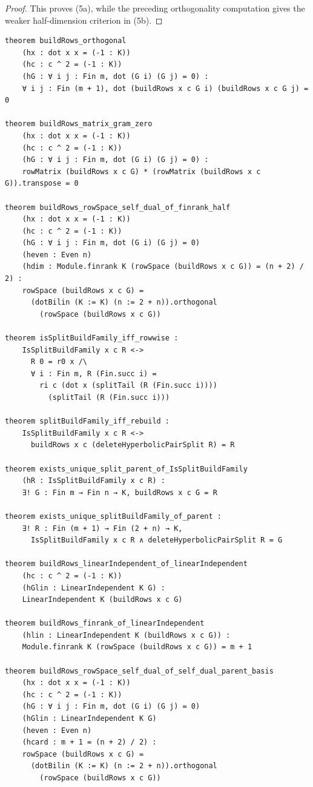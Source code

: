\documentclass[12pt]{article}
\newenvironment{blueblock}{\begingroup\color{blue}}{\endgroup}
\begin{document}
\begin{blueblock}
\begin{proof}
This proves (5a), while the preceding orthogonality computation gives the weaker half-dimension criterion in (5b).
\end{proof}

\begin{lstlisting}[caption={Lean bundle for Theorem~\ref{thm:qary-building-up}.}]
theorem buildRows_orthogonal
    (hx : dot x x = (-1 : K))
    (hc : c ^ 2 = (-1 : K))
    (hG : ∀ i j : Fin m, dot (G i) (G j) = 0) :
    ∀ i j : Fin (m + 1), dot (buildRows x c G i) (buildRows x c G j) = 0

theorem buildRows_matrix_gram_zero
    (hx : dot x x = (-1 : K))
    (hc : c ^ 2 = (-1 : K))
    (hG : ∀ i j : Fin m, dot (G i) (G j) = 0) :
    rowMatrix (buildRows x c G) * (rowMatrix (buildRows x c G)).transpose = 0

theorem buildRows_rowSpace_self_dual_of_finrank_half
    (hx : dot x x = (-1 : K))
    (hc : c ^ 2 = (-1 : K))
    (hG : ∀ i j : Fin m, dot (G i) (G j) = 0)
    (heven : Even n)
    (hdim : Module.finrank K (rowSpace (buildRows x c G)) = (n + 2) / 2) :
    rowSpace (buildRows x c G) =
      (dotBilin (K := K) (n := 2 + n)).orthogonal
        (rowSpace (buildRows x c G))

theorem isSplitBuildFamily_iff_rowwise :
    IsSplitBuildFamily x c R <->
      R 0 = r0 x /\
      ∀ i : Fin m, R (Fin.succ i) =
        ri c (dot x (splitTail (R (Fin.succ i))))
          (splitTail (R (Fin.succ i)))

theorem splitBuildFamily_iff_rebuild :
    IsSplitBuildFamily x c R <->
      buildRows x c (deleteHyperbolicPairSplit R) = R

theorem exists_unique_split_parent_of_IsSplitBuildFamily
    (hR : IsSplitBuildFamily x c R) :
    ∃! G : Fin m → Fin n → K, buildRows x c G = R

theorem exists_unique_splitBuildFamily_of_parent :
    ∃! R : Fin (m + 1) → Fin (2 + n) → K,
      IsSplitBuildFamily x c R ∧ deleteHyperbolicPairSplit R = G

theorem buildRows_linearIndependent_of_linearIndependent
    (hc : c ^ 2 = (-1 : K))
    (hGlin : LinearIndependent K G) :
    LinearIndependent K (buildRows x c G)

theorem buildRows_finrank_of_linearIndependent
    (hlin : LinearIndependent K (buildRows x c G)) :
    Module.finrank K (rowSpace (buildRows x c G)) = m + 1

theorem buildRows_rowSpace_self_dual_of_self_dual_parent_basis
    (hx : dot x x = (-1 : K))
    (hc : c ^ 2 = (-1 : K))
    (hG : ∀ i j : Fin m, dot (G i) (G j) = 0)
    (hGlin : LinearIndependent K G)
    (heven : Even n)
    (hcard : m + 1 = (n + 2) / 2) :
    rowSpace (buildRows x c G) =
      (dotBilin (K := K) (n := 2 + n)).orthogonal
        (rowSpace (buildRows x c G))
\end{lstlisting}
\end{blueblock}
\end{document}
